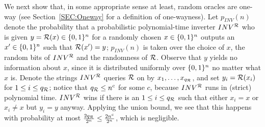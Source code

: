 We next show that, in some appropriate sense at least, random oracles are
one-way (see Section~\ref{SEC:Oneway} for a definition of one-wayness).  Let
$p_{INV}(n)$ denote the probability that a probabilistic polynomial-time
inverter $INV^{\mathcal{R}}$ who 
is given $y = \mathcal{R}(x) \in \{0,1\}^{n}$ for a randomly chosen $x \in \{0,1\}^{n}$
outputs an $x' \in \{0,1\}^{n}$ such that $\mathcal{R}(x') = y$; $p_{INV}(n)$ is taken
over the choice of $x$, the random bits of $INV^{\mathcal{R}}$ and the randomness of
$\mathcal{R}$. Observe that $y$ yields no information about $x$, since it is
distributed uniformly over $\{0,1\}^{n}$ no matter what $x$ is. Denote the
strings $INV^{\mathcal{R}}$ queries $\mathcal{R}$ on by $x_1,\ldots,x_{q_{\mathcal{R}}}$, and set
$y_i = \mathcal{R}(x_i)$ for $1 \leq i \leq q_{\mathcal{R}}$;
notice that $q_{\mathcal{R}} \leq n^c$ for some $c$,
because $INV^{\mathcal{R}}$ runs in (strict) polynomial time. $INV^{\mathcal{R}}$ wins if
there is an $1 \leq i \leq q_{\mathcal{R}}$ such that either $x_i = x$ or $x_i \neq x$
but $y_i = y$ anyway. Applying the union bound, we see that this happens with probability at most
$\frac{2q_{\mathcal{R}}}{2^n} \leq \frac{2n^c}{2^n}$, which is negligible.

